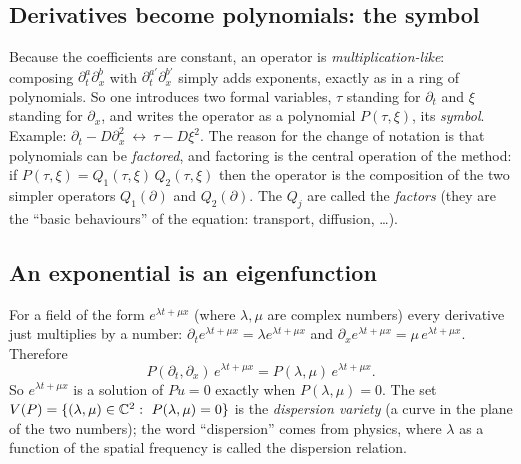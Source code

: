 \subsection{Derivatives become polynomials: the symbol}
Because the coefficients are constant, an operator is \emph{multiplication-like}: composing $\partial_t^a\partial_x^b$ with $\partial_t^{a'}\partial_x^{b'}$ simply adds exponents, exactly as in a ring of polynomials. So one introduces two formal variables, $\tau$ standing for $\partial_t$ and $\xi$ standing for $\partial_x$, and writes the operator as a polynomial $P(\tau,\xi)$, its \emph{symbol}. Example: $\partial_t-D\partial_x^2\ \leftrightarrow\ \tau-D\xi^2$. The reason for the change of notation is that polynomials can be \emph{factored}, and factoring is the central operation of the method: if $P(\tau,\xi)=Q_1(\tau,\xi)\,Q_2(\tau,\xi)$ then the operator is the composition of the two simpler operators $Q_1(\partial)$ and $Q_2(\partial)$. The $Q_j$ are called the \emph{factors} (they are the ``basic behaviours'' of the equation: transport, diffusion, \dots).

\subsection{An exponential is an eigenfunction}
For a field of the form $e^{\lambda t+\mu x}$ (where $\lambda,\mu$ are complex numbers) every derivative just multiplies by a number: $\partial_te^{\lambda t+\mu x}=\lambda e^{\lambda t+\mu x}$ and $\partial_xe^{\lambda t+\mu x}=\mu\, e^{\lambda t+\mu x}$. Therefore
\begin{equation}\label{eq:eigen}
P(\partial_t,\partial_x)\,e^{\lambda t+\mu x}=P(\lambda,\mu)\,e^{\lambda t+\mu x}.
\end{equation}
So $e^{\lambda t+\mu x}$ is a solution of $Pu=0$ exactly when $P(\lambda,\mu)=0$. The set $V(P)=\{(\lambda,\mu)\in\C^2:\ P(\lambda,\mu)=0\}$ is the \emph{dispersion variety} (a curve in the plane of the two numbers); the word ``dispersion'' comes from physics, where $\lambda$ as a function of the spatial frequency is called the dispersion relation.

